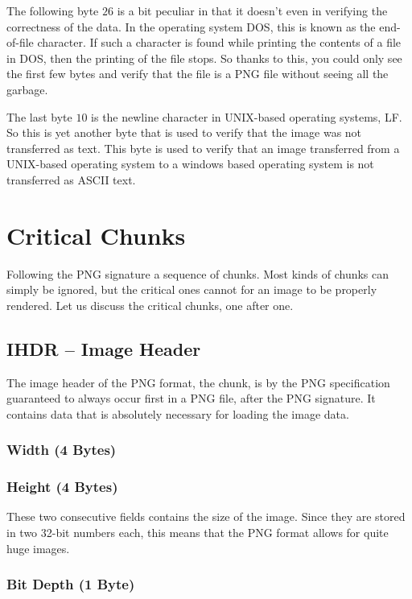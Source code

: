The following byte $26$ is a bit peculiar in that it doesn't even in
verifying the correctness of the data. In the operating system DOS,
this is known as the end-of-file character. If such a character is
found while printing the contents of a file in DOS, then the printing
of the file stops. So thanks to this, you could only see the first few
bytes and verify that the file is a PNG file without seeing all the
garbage. 

The last byte $10$ is the newline character in UNIX-based operating
systems, LF. So this is yet another byte that is used to verify that
the image was not transferred as text. This byte is used to verify
that an image transferred from a UNIX-based operating system to a
windows based operating system is not transferred as ASCII text.

\section{Critical Chunks}

Following the PNG signature a sequence of chunks. Most kinds of chunks
can simply be ignored, but the critical ones cannot for an image to be
properly rendered. Let us discuss the critical chunks, one after one.

\subsection{IHDR -- Image Header}

The image header of the PNG format, the  chunk, is by the
PNG specification guaranteed to always occur first in a PNG file,
after the PNG signature. It contains data that is absolutely necessary
for loading the image data.

\subsubsection*{Width (4 Bytes)}
\subsubsection*{Height (4 Bytes)}

These two consecutive fields contains the size of the image. Since
they are stored in two 32-bit numbers each, this means that the PNG
format allows for quite huge images.

\subsubsection*{Bit Depth (1 Byte)}

